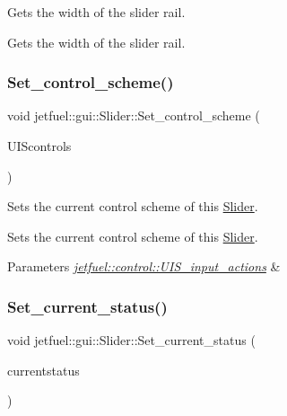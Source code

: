 Gets the width of the slider rail. 

Gets the width of the slider rail. \mbox{\label{classjetfuel_1_1gui_1_1Slider_a64531a8ed9353906ffb8e1b5720e9409}} 
\subsubsection{\texorpdfstring{Set\+\_\+control\+\_\+scheme()}{Set\_control\_scheme()}}
{\footnotesize\ttfamily void jetfuel\+::gui\+::\+Slider\+::\+Set\+\_\+control\+\_\+scheme (\begin{DoxyParamCaption}\item[{\hyperlink{structjetfuel_1_1control_1_1UIS__input__actions}{jetfuel\+::control\+::\+U\+I\+S\+\_\+input\+\_\+actions}}]{U\+I\+Scontrols }\end{DoxyParamCaption})\hspace{0.3cm}{\ttfamily [inline]}}



Sets the current control scheme of this \hyperlink{classjetfuel_1_1gui_1_1Slider}{Slider}. 

Sets the current control scheme of this \hyperlink{classjetfuel_1_1gui_1_1Slider}{Slider}.


\begin{DoxyParams}{Parameters}
{\em \hyperlink{structjetfuel_1_1control_1_1UIS__input__actions}{jetfuel\+::control\+::\+U\+I\+S\+\_\+input\+\_\+actions}} & \\
\hline
\end{DoxyParams}
\mbox{\label{classjetfuel_1_1gui_1_1Slider_aa7a8125e92817f0df7899cc23f34fce7}} 
\subsubsection{\texorpdfstring{Set\+\_\+current\+\_\+status()}{Set\_current\_status()}}
{\footnotesize\ttfamily void jetfuel\+::gui\+::\+Slider\+::\+Set\+\_\+current\+\_\+status (\begin{DoxyParamCaption}\item[{const unsigned int}]{currentstatus }\end{DoxyParamCaption})\hspace{0.3cm}{\ttfamily [inline]}}




